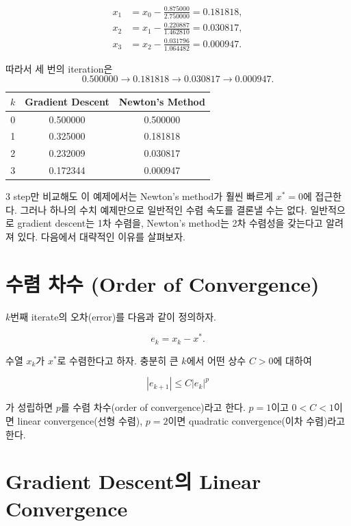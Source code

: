 \documentclass[11pt,a4paper]{article}
\begin{document}
\[
\begin{aligned}
x_1
&=x_0-\frac{0.875000}{2.750000}
 =0.181818,\\
x_2
&=x_1-\frac{0.220887}{1.462810}
 =0.030817,\\
x_3
&=x_2-\frac{0.031796}{1.064482}
 =0.000947.
\end{aligned}
\]

따라서 세 번의 iteration은
\[
0.500000
\longrightarrow
0.181818
\longrightarrow
0.030817
\longrightarrow
0.000947.
\]

\begin{center}
\begin{tabular}{ccc}
\toprule
$k$ & Gradient Descent & Newton's Method\\
\midrule
0 & 0.500000 & 0.500000\\
1 & 0.325000 & 0.181818\\
2 & 0.232009 & 0.030817\\
3 & 0.172344 & 0.000947\\
\bottomrule
\end{tabular}
\end{center}

3 step만 비교해도 이 예제에서는 Newton's method가 훨씬 빠르게 $x^*=0$에 접근한다. 
그러나 하나의 수치 예제만으로 일반적인 수렴 속도를 결론낼 수는 없다. 
일반적으로 gradient descent는 1차 수렴을, Newton’s method는 2차 수렴성을 갖는다고 알려져 있다. 
다음에서 대략적인 이유를 살펴보자.


\section{수렴 차수 (Order of Convergence)}

$k$번째 iterate의 오차(error)를 다음과 같이 정의하자.

\[
    e_k=x_k-x^*.
\]

수열 $x_k$가 $x^*$로 수렴한다고 하자. 충분히 큰 $k$에서 어떤 상수 $C>0$에 대하여

\[
    |e_{k+1}|
    \le C|e_k|^p
\]

가 성립하면 $p$를 수렴 차수(order of convergence)라고 한다.
$p=1$이고 $0<C<1$이면 linear convergence(선형 수렴),
$p=2$이면 quadratic convergence(이차 수렴)라고 한다.


\section{Gradient Descent의 Linear Convergence}
\end{document}
